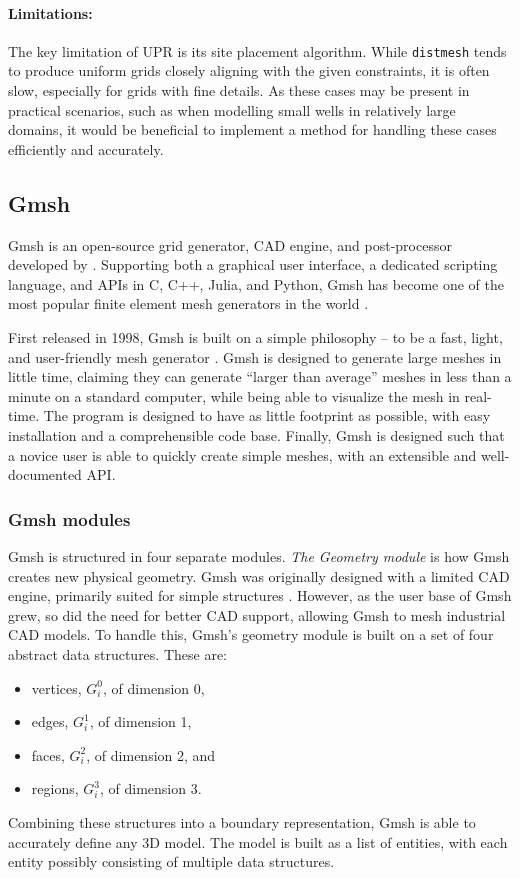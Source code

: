 \paragraph{Limitations:}
The key limitation of UPR is its site placement algorithm. While \verb|distmesh| tends to produce uniform grids closely aligning with the given constraints, it is often slow, especially for grids with fine details. As these cases may be present in practical scenarios, such as when modelling small wells in relatively large domains, it would be beneficial to implement a method for handling these cases efficiently and accurately.


\subsection{Gmsh}
\label{sec:Gmsh}
Gmsh is an open-source grid generator, CAD engine, and post-processor developed by \textcite{Gmsh_article}. Supporting both a graphical user interface, a dedicated scripting language, and APIs in C, C++, Julia, and Python, Gmsh has become one of the most popular finite element mesh generators in the world \cite{Gmsh_presentation}.

First released in 1998, Gmsh is built on a simple philosophy -- to be a fast, light, and user-friendly mesh generator \cite{Gmsh_article}. Gmsh is designed to generate large meshes in little time, claiming they can generate ``larger than average'' meshes in less than a minute on a standard computer, while being able to visualize the mesh in real-time. The program is designed to have as little footprint as possible, with easy installation and a comprehensible code base. Finally, Gmsh is designed such that a novice user is able to quickly create simple meshes, with an extensible and well-documented API.

\subsubsection{Gmsh modules}
\label{sec:gmsh-modules}
Gmsh is structured in four separate modules. \emph{The Geometry module} is how Gmsh creates new physical geometry. Gmsh was originally designed with a limited CAD engine, primarily suited for simple structures \cite{Gmsh_article}. However, as the user base of Gmsh grew, so did the need for better CAD support, allowing Gmsh to mesh industrial CAD models. To handle this, Gmsh's geometry module is built on a set of four abstract data structures. These are:
\begin{itemize}
    \item vertices, $G_i^0$, of dimension 0,
    \item edges, $G_i^1$, of dimension 1,
    \item faces, $G_i^2$, of dimension 2, and
    \item regions, $G_i^3$, of dimension 3.
\end{itemize}
Combining these structures into a boundary representation, Gmsh is able to accurately define any 3D model. The model is built as a list of entities, with each entity possibly consisting of multiple data structures.

